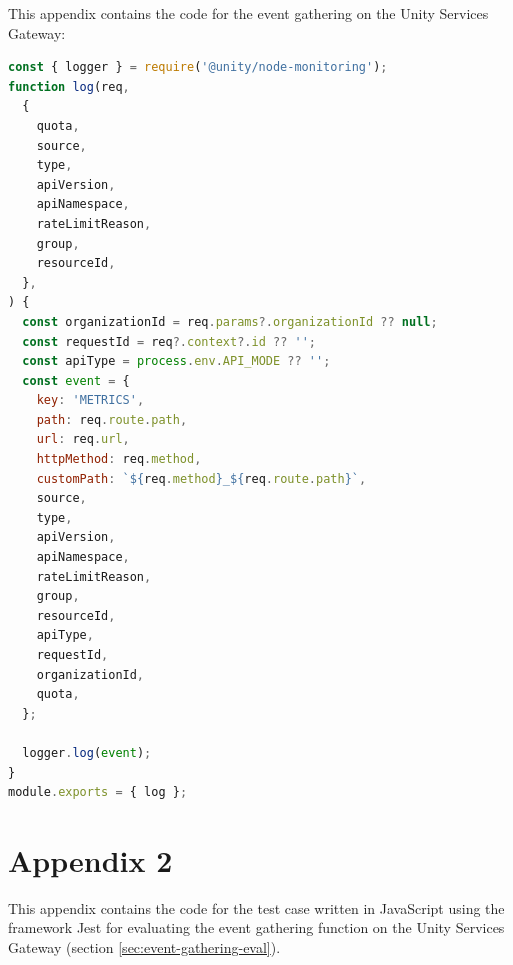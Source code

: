 \documentclass[english, 12pt, a4paper, sci, utf8, a-1b, online]{aaltothesis}
\begin{document}
This appendix contains the code for the event gathering on the Unity Services Gateway:

\begin{lstlisting}[language=JavaScript,firstnumber=1]
const { logger } = require('@unity/node-monitoring');
function log(req,
  {
    quota,
    source,
    type,
    apiVersion,
    apiNamespace,
    rateLimitReason,
    group,
    resourceId,
  },
) {
  const organizationId = req.params?.organizationId ?? null;
  const requestId = req?.context?.id ?? '';
  const apiType = process.env.API_MODE ?? '';
  const event = {
    key: 'METRICS',
    path: req.route.path,
    url: req.url,
    httpMethod: req.method,
    customPath: `${req.method}_${req.route.path}`,
    source,
    type,
    apiVersion,
    apiNamespace,
    rateLimitReason,
    group,
    resourceId,
    apiType,
    requestId,
    organizationId,
    quota,
  };

  logger.log(event);
}
module.exports = { log };
\end{lstlisting}

\clearpage
\section{Appendix 2}
\label{apx:jest-eval}

This appendix contains the code for the test case written in JavaScript using the framework Jest for evaluating the event gathering function on the Unity Services Gateway (section \ref{sec:event-gathering-eval}).
\end{document}
